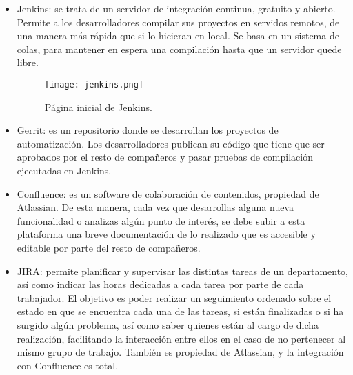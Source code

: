 \begin{itemize}
	\item{Jenkins: se trata de un servidor de integración continua, gratuito y abierto. Permite a los desarrolladores compilar sus proyectos en servidos remotos, de una manera más rápida que si lo hicieran en local. Se basa en un sistema de colas, para mantener en espera una compilación hasta que un servidor quede libre.}
	\begin{figure}[H]
		\centering
		\texttt{[image: jenkins.png]}
		\caption{Página inicial de Jenkins.}
		\label{fig:jenkins}
	\end{figure}	
	\item{Gerrit: es un repositorio donde se desarrollan los proyectos de automatización. Los desarrolladores publican su código que tiene que ser aprobados por el resto de compañeros y pasar pruebas de compilación ejecutadas en Jenkins.}	
	\item{Confluence: es un software de colaboración de contenidos, propiedad de Atlassian. De esta manera, cada vez que desarrollas alguna nueva funcionalidad o analizas algún punto de interés, se debe subir a esta plataforma una breve documentación de lo realizado que es accesible y editable por parte del resto de compañeros.}	
	\item{JIRA: permite planificar y supervisar las distintas tareas de un departamento, así como indicar las horas dedicadas a cada tarea por parte de cada trabajador. El objetivo es poder realizar un seguimiento ordenado sobre el estado en que se encuentra cada una de las tareas, si están finalizadas o si ha surgido algún problema, así como saber quienes están al cargo de dicha realización, facilitando la interacción entre ellos en el caso de no pertenecer al mismo grupo de trabajo. También es propiedad de Atlassian, y la integración con Confluence es total.}	
\end{itemize}





